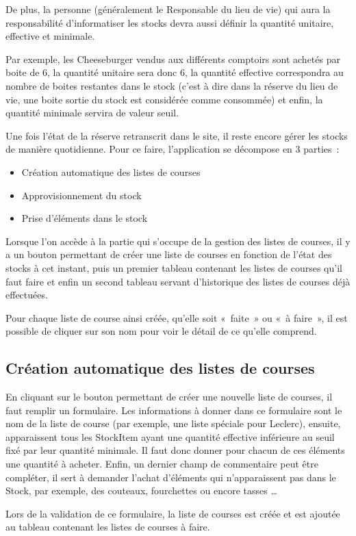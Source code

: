 \documentclass[a4paper]{report}
\begin{document}
\par De plus, la personne (généralement le Responsable du lieu de vie) qui aura la responsabilité d’informatiser les stocks devra aussi définir la quantité unitaire, effective et minimale. 
\par Par exemple, les Cheeseburger vendus aux différents comptoirs sont achetés par boite de 6, la quantité unitaire sera donc 6, la quantité effective correspondra au nombre de boites restantes dans le stock (c’est à dire dans la réserve du lieu de vie, une boite sortie du stock est considérée comme consommée) et enfin, la quantité minimale servira de valeur seuil.
\par Une fois l’état de la réserve retranscrit dans le site, il reste encore gérer les stocks de manière quotidienne. Pour ce faire, l’application se décompose en 3 parties :
\begin{itemize}
    \item Création automatique des listes de courses
    \item Approvisionnement du stock
    \item Prise d’éléments dans le stock
\end{itemize}

\par Lorsque l’on accède à la partie qui s’occupe de la gestion des listes de courses, il y a un bouton permettant de créer une liste de courses en fonction de l’état des stocks à cet instant, puis un premier tableau contenant les listes de courses qu’il faut faire et enfin un second tableau servant d’historique des listes de courses déjà effectuées.
\par Pour chaque liste de course ainsi créée, qu’elle soit « faite » ou « à faire », il est possible de cliquer sur son nom pour voir le détail de ce qu’elle comprend.

\subsection{Création automatique des listes de courses}
\par En cliquant sur le bouton permettant de créer une nouvelle liste de courses, il faut remplir un formulaire. Les informations à donner dans ce formulaire sont le nom de la liste de course (par exemple, une liste spéciale pour Leclerc), ensuite, apparaissent tous les StockItem ayant une quantité effective inférieure au seuil fixé par leur quantité minimale. Il faut donc donner pour chacun de ces éléments une quantité à acheter. Enfin, un dernier champ de commentaire peut être compléter, il sert à demander l’achat d’éléments qui n’apparaissent pas dans le Stock, par exemple, des couteaux, fourchettes ou encore tasses … 
\par Lors de la validation de ce formulaire, la liste de courses est créée et est ajoutée au tableau contenant les listes de courses à faire.
\end{document}
